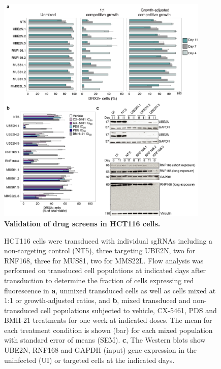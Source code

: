 \begin{figure}
    \centering
    \includegraphics[width=0.9\textwidth]{supplement/figures/screen_validation}
    \caption[Gene hits validation]
            {\small{\textbf{Validation of drug screens in HCT116 cells.}}
            }
        \label{sfig:validation}
\end{figure}

\addtocounter{figure}{-1}
\begin{figure}
  \caption{
             HCT116 cells were transduced with individual sgRNAs including a non-targeting control (NT5), three targeting UBE2N, two for RNF168, three for MUS81, two for MMS22L. Flow analysis was performed on transduced cell populations at indicated days after transduction to determine the fraction of cells expressing red fluorescence in \textbf{a}, unmixed transduced cells as well as cells mixed at 1:1 or growth-adjusted ratios, and \textbf{b}, mixed transduced and non-transduced cell populations subjected to vehicle, CX-5461, PDS and BMH-21 treatments for one week at indicated doses. The mean for each treatment condition is shown (bar) for each mixed population with standard error of means (SEM).   
            \textbf{c}, The Western blots show UBE2N, RNF168 and GAPDH (input) gene expression in the uninfected (UI) or targeted cells at the indicated days. 
    }
\end{figure}

